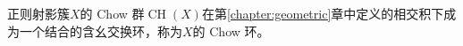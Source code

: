 \begin{remark}
正则射影簇$X$的 Chow 群$\operatorname{CH}(X)$在第\ref{chapter:geometric}章中定义的相交积下成为一个结合的含幺交换环，称为$X$的 Chow 环。
\end{remark}









